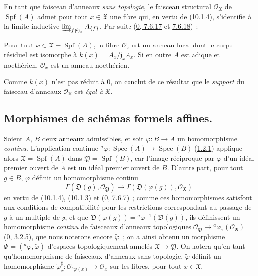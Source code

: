 \begin{env}[10.1.5]
\label{I.10.1.5-fr}
En tant que faisceau d'anneaux \emph{sans topologie}, le faisceau
structural $\mathscr{O}_{\mathfrak{X}}$ de
$\operatorname{Spf}(A)$ admet pour tout $x\in\mathfrak{X}$ une fibre qui,
en vertu de (\hyperref[I.10.1.4-fr]{10.1.4}), s'identifie à la limite
inductive
$\varinjlim_{f\notin\mathfrak{j}_x}A_{\{f\}}$. Par suite
(\hyperref[0.7.6.17-fr]{0, 7.6.17} et
\hyperref[0.7.6.18-fr]{7.6.18})~:
\end{env}

\begin{proposition}[10.1.6]
\label{I.10.1.6-fr}
Pour tout $x\in\mathfrak{X}=\operatorname{Spf}(A)$, la fibre
$\mathscr{O}_x$ est un anneau local dont le corps résiduel est isomorphe à
$k(x)=A_x/\mathfrak{j}_xA_x$. Si en outre $A$ est adique et noethérien,
$\mathscr{O}_x$ est un anneau noethérien.
\end{proposition}

Comme $k(x)$ n'est pas réduit à 0, on conclut de ce résultat que le
\emph{support} du faisceau d'anneaux $\mathscr{O}_{\mathfrak{X}}$ est
\emph{égal à $\mathfrak{X}$}.

\subsection{Morphismes de schémas formels affines.}
\label{subsection:I.10.2-fr}

\begin{env}[10.2.1]
\label{I.10.2.1-fr}
Soient $A$, $B$ deux anneaux admissibles, et soit
$\varphi:B\to A$ un homomorphisme \emph{continu}. L'application continue
$ {}^a\varphi:\operatorname{Spec}(A)\to\operatorname{Spec}(B)$
(\hyperref[I.1.2.1-fr]{1.2.1}) applique alors
$\mathfrak{X}=\operatorname{Spf}(A)$ dans
$\mathfrak{Y}=\operatorname{Spf}(B)$, car l'image réciproque par
$\varphi$ d'un idéal premier ouvert de $A$ est un idéal premier ouvert de
$B$. D'autre part, pour tout $g\in B$, $\varphi$ définit un homomorphisme
continu
\[
  \Gamma(\mathfrak{D}(g),\mathscr{O}_{\mathfrak{Y}})
  \longrightarrow
  \Gamma(\mathfrak{D}(\varphi(g)),\mathscr{O}_{\mathfrak{X}})
\]
en vertu de (\hyperref[I.10.1.4-fr]{10.1.4}),
(\hyperref[I.10.1.3-fr]{10.1.3}) et
(\hyperref[0.7.6.7-fr]{0, 7.6.7})~; comme ces homomorphismes satisfont aux
conditions de compatibilité pour les restrictions correspondant au
passage de $g$ à un multiple de $g$, et que
$\mathfrak{D}(\varphi(g))={}^a\varphi^{-1}(\mathfrak{D}(g))$, ils
définissent un homomorphisme \emph{continu} de faisceaux d'anneaux
topologiques
$\mathscr{O}_{\mathfrak{Y}}\to
{}^a\varphi_*(\mathscr{O}_{\mathfrak{X}})$
(\hyperref[0.3.2.5-fr]{0, 3.2.5}), que nous noterons encore
$\widetilde{\varphi}$~; on a ainsi obtenu un morphisme
$\Phi=({}^a\varphi,\widetilde{\varphi})$ d'espaces topologiquement annelés
$\mathfrak{X}\to\mathfrak{Y}$. On notera qu'en tant qu'homomorphisme de
faisceaux d'anneaux sans topologie, $\widetilde{\varphi}$ définit un
homomorphisme
$\widetilde{\varphi}_x^\sharp:
\mathscr{O}_{{}^a\varphi(x)}\to\mathscr{O}_x$ sur les fibres, pour tout
$x\in\mathfrak{X}$.
\end{env}

